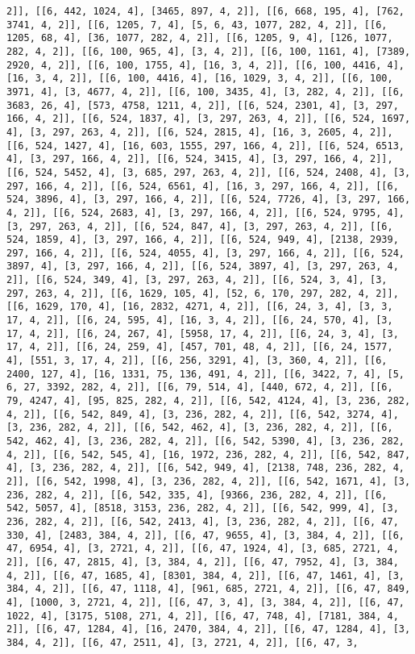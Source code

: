 \documentclass[12pt,fleqn]{article}\usepackage{../../common}
\begin{document}
\begin{verbatim}
2]], [[6, 442, 1024, 4], [3465, 897, 4, 2]], [[6, 668, 195, 4], [762, 3741, 4, 2]], [[6, 1205, 7, 4], [5, 6, 43, 1077, 282, 4, 2]], [[6, 1205, 68, 4], [36, 1077, 282, 4, 2]], [[6, 1205, 9, 4], [126, 1077, 282, 4, 2]], [[6, 100, 965, 4], [3, 4, 2]], [[6, 100, 1161, 4], [7389, 2920, 4, 2]], [[6, 100, 1755, 4], [16, 3, 4, 2]], [[6, 100, 4416, 4], [16, 3, 4, 2]], [[6, 100, 4416, 4], [16, 1029, 3, 4, 2]], [[6, 100, 3971, 4], [3, 4677, 4, 2]], [[6, 100, 3435, 4], [3, 282, 4, 2]], [[6, 3683, 26, 4], [573, 4758, 1211, 4, 2]], [[6, 524, 2301, 4], [3, 297, 166, 4, 2]], [[6, 524, 1837, 4], [3, 297, 263, 4, 2]], [[6, 524, 1697, 4], [3, 297, 263, 4, 2]], [[6, 524, 2815, 4], [16, 3, 2605, 4, 2]], [[6, 524, 1427, 4], [16, 603, 1555, 297, 166, 4, 2]], [[6, 524, 6513, 4], [3, 297, 166, 4, 2]], [[6, 524, 3415, 4], [3, 297, 166, 4, 2]], [[6, 524, 5452, 4], [3, 685, 297, 263, 4, 2]], [[6, 524, 2408, 4], [3, 297, 166, 4, 2]], [[6, 524, 6561, 4], [16, 3, 297, 166, 4, 2]], [[6, 524, 3896, 4], [3, 297, 166, 4, 2]], [[6, 524, 7726, 4], [3, 297, 166, 4, 2]], [[6, 524, 2683, 4], [3, 297, 166, 4, 2]], [[6, 524, 9795, 4], [3, 297, 263, 4, 2]], [[6, 524, 847, 4], [3, 297, 263, 4, 2]], [[6, 524, 1859, 4], [3, 297, 166, 4, 2]], [[6, 524, 949, 4], [2138, 2939, 297, 166, 4, 2]], [[6, 524, 4055, 4], [3, 297, 166, 4, 2]], [[6, 524, 3897, 4], [3, 297, 166, 4, 2]], [[6, 524, 3897, 4], [3, 297, 263, 4, 2]], [[6, 524, 349, 4], [3, 297, 263, 4, 2]], [[6, 524, 3, 4], [3, 297, 263, 4, 2]], [[6, 1629, 105, 4], [52, 6, 170, 297, 282, 4, 2]], [[6, 1629, 170, 4], [16, 2832, 4271, 4, 2]], [[6, 24, 3, 4], [3, 3, 17, 4, 2]], [[6, 24, 595, 4], [16, 3, 4, 2]], [[6, 24, 570, 4], [3, 17, 4, 2]], [[6, 24, 267, 4], [5958, 17, 4, 2]], [[6, 24, 3, 4], [3, 17, 4, 2]], [[6, 24, 259, 4], [457, 701, 48, 4, 2]], [[6, 24, 1577, 4], [551, 3, 17, 4, 2]], [[6, 256, 3291, 4], [3, 360, 4, 2]], [[6, 2400, 127, 4], [16, 1331, 75, 136, 491, 4, 2]], [[6, 3422, 7, 4], [5, 6, 27, 3392, 282, 4, 2]], [[6, 79, 514, 4], [440, 672, 4, 2]], [[6, 79, 4247, 4], [95, 825, 282, 4, 2]], [[6, 542, 4124, 4], [3, 236, 282, 4, 2]], [[6, 542, 849, 4], [3, 236, 282, 4, 2]], [[6, 542, 3274, 4], [3, 236, 282, 4, 2]], [[6, 542, 462, 4], [3, 236, 282, 4, 2]], [[6, 542, 462, 4], [3, 236, 282, 4, 2]], [[6, 542, 5390, 4], [3, 236, 282, 4, 2]], [[6, 542, 545, 4], [16, 1972, 236, 282, 4, 2]], [[6, 542, 847, 4], [3, 236, 282, 4, 2]], [[6, 542, 949, 4], [2138, 748, 236, 282, 4, 2]], [[6, 542, 1998, 4], [3, 236, 282, 4, 2]], [[6, 542, 1671, 4], [3, 236, 282, 4, 2]], [[6, 542, 335, 4], [9366, 236, 282, 4, 2]], [[6, 542, 5057, 4], [8518, 3153, 236, 282, 4, 2]], [[6, 542, 999, 4], [3, 236, 282, 4, 2]], [[6, 542, 2413, 4], [3, 236, 282, 4, 2]], [[6, 47, 330, 4], [2483, 384, 4, 2]], [[6, 47, 9655, 4], [3, 384, 4, 2]], [[6, 47, 6954, 4], [3, 2721, 4, 2]], [[6, 47, 1924, 4], [3, 685, 2721, 4, 2]], [[6, 47, 2815, 4], [3, 384, 4, 2]], [[6, 47, 7952, 4], [3, 384, 4, 2]], [[6, 47, 1685, 4], [8301, 384, 4, 2]], [[6, 47, 1461, 4], [3, 384, 4, 2]], [[6, 47, 1118, 4], [961, 685, 2721, 4, 2]], [[6, 47, 849, 4], [1000, 3, 2721, 4, 2]], [[6, 47, 3, 4], [3, 384, 4, 2]], [[6, 47, 1022, 4], [3175, 5108, 271, 4, 2]], [[6, 47, 748, 4], [7181, 384, 4, 2]], [[6, 47, 1284, 4], [16, 2470, 384, 4, 2]], [[6, 47, 1284, 4], [3, 384, 4, 2]], [[6, 47, 2511, 4], [3, 2721, 4, 2]], [[6, 47, 3, 
\end{verbatim}
\end{document}
